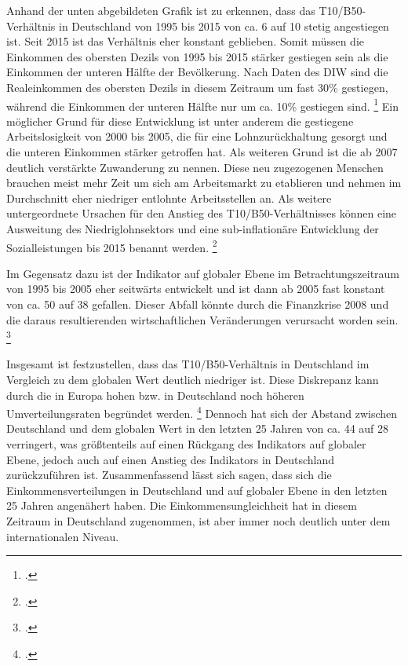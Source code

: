 Anhand der unten abgebildeten Grafik ist zu erkennen, dass das T10/B50-Verhältnis in Deutschland von 1995 bis 2015 von ca. 6 auf 10 stetig angestiegen ist.  Seit 2015 ist das Verhältnis eher konstant geblieben. Somit müssen die Einkommen des obersten Dezils von 1995 bis 2015 stärker gestiegen sein als die Einkommen der unteren Hälfte der Bevölkerung. Nach Daten des DIW sind die Realeinkommen des obersten Dezils in diesem Zeitraum um fast 30\% gestiegen, während die Einkommen der unteren Hälfte nur um ca. 10\% gestiegen sind. \footcite[Vgl.][S. 452]{grabka_einkommensverteilung_2018} Ein möglicher Grund für diese Entwicklung ist unter anderem die gestiegene Arbeitslosigkeit von 2000 bis 2005, die für eine Lohnzurückhaltung gesorgt und die unteren Einkommen stärker getroffen hat. Als weiteren Grund ist die ab 2007 deutlich verstärkte Zuwanderung zu nennen. Diese neu zugezogenen Menschen brauchen meist mehr Zeit um sich am Arbeitsmarkt zu etablieren und nehmen im Durchschnitt eher niedriger entlohnte Arbeitsstellen an. Als weitere untergeordnete Ursachen für den Anstieg des T10/B50-Verhältnisses können eine Ausweitung des Niedriglohnsektors und eine sub-inflationäre Entwicklung der Sozialleistungen bis 2015 benannt werden. \footcite[Vgl.][S. 453f]{grabka_einkommensverteilung_2018}

Im Gegensatz dazu ist der Indikator auf globaler Ebene im Betrachtungszeitraum von 1995 bis 2005 eher seitwärts entwickelt und ist dann ab 2005 fast konstant von ca. 50 auf 38 gefallen. Dieser Abfall könnte durch die Finanzkrise 2008 und die daraus resultierenden wirtschaftlichen Veränderungen verursacht worden sein. \footcite[Vgl.][S. 55]{wir_2022}

Insgesamt ist festzustellen, dass das T10/B50-Verhältnis in Deutschland im Vergleich zu dem globalen Wert deutlich niedriger ist. Diese Diskrepanz kann durch die in Europa hohen bzw. in Deutschland noch höheren Umverteilungsraten begründet werden. \footcite[Vgl.][S. 36f]{wir_2022} Dennoch hat sich der Abstand zwischen Deutschland und dem globalen Wert in den letzten 25 Jahren von ca. 44 auf 28 verringert, was grö{\ss}tenteils auf einen Rückgang des Indikators auf globaler Ebene, jedoch auch auf einen Anstieg des Indikators in Deutschland zurückzuführen ist. Zusammenfassend lässt sich sagen, dass sich die Einkommensverteilungen in Deutschland und auf globaler Ebene in den letzten 25 Jahren angenähert haben. Die Einkommensungleichheit hat in diesem Zeitraum in Deutschland zugenommen, ist aber immer noch deutlich unter dem internationalen Niveau.

